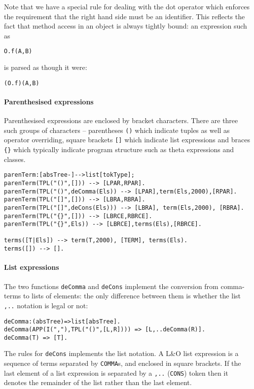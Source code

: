 Note that we have a special rule for dealing with the dot operator which enforces the requirement that the right hand side must be an identifier. This reflects the fact that method access in an object is always tightly bound: an expression such as
\begin{verbatim}
O.f(A,B)
\end{verbatim}
is parsed as though it were:
\begin{verbatim}
(O.f)(A,B)
\end{verbatim}

\paragraph{Parenthesised expressions}
Parenthesised expressions are enclosed by bracket characters. There are three such groups of characters -- parentheses \verb+()+ which indicate tuples as well as operator overriding, square brackets \verb+[]+ which indicate list expressions and braces \verb+{}+ which typically indicate program structure such as theta expressions and classes.

\begin{verbatim}
parenTerm:[absTree-]-->list[tokType];
parenTerm(TPL("()",[])) --> [LPAR,RPAR].
parenTerm(TPL("()",deComma(Els)) --> [LPAR],term(Els,2000),[RPAR].
parenTerm(TPL("[]",[])) --> [LBRA,RBRA].
parenTerm(TPL("[]",deCons(Els))) --> [LBRA], term(Els,2000), [RBRA].
parenTerm(TPL("{}",[])) --> [LBRCE,RBRCE].
parenTerm(TPL("{}",Els)) --> [LBRCE],terms(Els),[RBRCE].

terms([T|Els]) --> term(T,2000), [TERM], terms(Els).
terms([]) --> [].
\end{verbatim}

\paragraph{List expressions}
\label{grammar:lists}    
The two functions \verb+deComma+ and \verb+deCons+ implement the conversion from comma-terms to lists of elements: the only difference between them is whether the list \verb+,..+ notation is legal or not:
\begin{verbatim}
deComma:(absTree)=>list[absTree].
deComma(APP(I(","),TPL("()",[L,R]))) => [L,..deComma(R)].
deComma(T) => [T].
\end{verbatim}
The rules for \verb+deCons+ implements the list notation. A L&O list expression is a sequence of terms separated by \verb+COMMA+s, and enclosed in square brackets. If the last element of a list expression is separated by a \verb+,..+ (\verb+CONS+) token then it denotes the remainder of the list rather than the last element.
     
